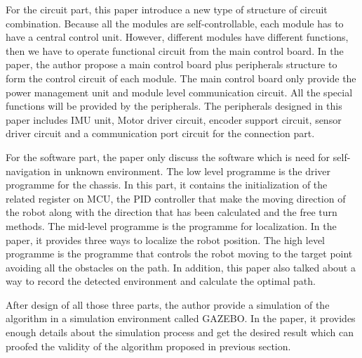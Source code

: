 \begin{bigabstract}
For the circuit part, this paper introduce a new type of structure of circuit combination. Because all the modules are self-controllable, each module has to have a central control unit. However, different modules have different functions, then we have to operate functional circuit from the main control board. In the paper, the author propose a main control board plus peripherals structure to form the control circuit of each module. The main control board only provide the power management unit and module level communication circuit. All the special functions will be provided by the peripherals. The peripherals designed in this paper includes IMU unit, Motor driver circuit, encoder support circuit, sensor driver circuit and a communication port circuit for the connection part.

For the software part, the paper only discuss the software which is need for self-navigation in unknown environment. The low level programme is the driver programme for the chassis. In this part, it contains the initialization of the related register on MCU, the PID controller that make the moving direction of the robot along with the direction that has  been calculated and the free turn methods. The mid-level programme is the programme for localization. In the paper, it provides three ways to localize the robot position. The high level programme is the programme that controls the robot moving to the target point avoiding all the obstacles on the path. In addition, this paper also talked about a way to record the detected environment and calculate the optimal path.

After design of all those three parts, the author provide a simulation of the algorithm in a simulation environment called GAZEBO. In the paper, it provides enough details about the simulation process and get the desired result which can proofed the validity of the algorithm proposed in previous section.
\end{bigabstract}
